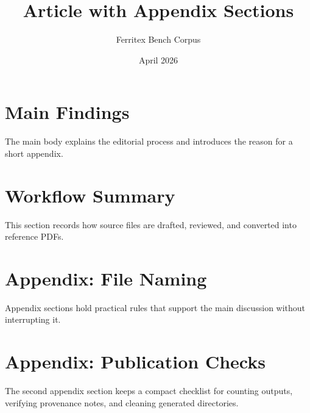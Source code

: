 \documentclass{article}
\title{Article with Appendix Sections}
\author{Ferritex Bench Corpus}
\date{April 2026}
\begin{document}
\maketitle
\tableofcontents

\section{Main Findings}
The main body explains the editorial process and introduces the reason for a
short appendix.

\section{Workflow Summary}
This section records how source files are drafted, reviewed, and converted
into reference PDFs.

\appendix
\section{Appendix: File Naming}
Appendix sections hold practical rules that support the main discussion
without interrupting it.

\section{Appendix: Publication Checks}
The second appendix section keeps a compact checklist for counting outputs,
verifying provenance notes, and cleaning generated directories.
\end{document}
